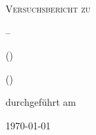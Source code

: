 
\makeatletter
\newcommand*{\protokollemailparse}[1]{%
	\@for\@tempa:=#1\do{%
		\normalsize\email{\@tempa}\\
	}%
}
\makeatother

\begin{titlepage}
	\centering
	{\scshape\LARGE Versuchsbericht zu \par}
	\vspace{1cm}
	{\scshape\huge \varNum {} -- \varName\par}
	\vspace{2.5cm}
	{\LARGE \varGruppe\par}
	\vspace{0.5cm}
	{\large \varNameA (\varEmailA) \par}
	{\large \varNameB (\varEmailB) \par}
	\vfill
	durchgeführt am \varDatum\par
	{\large \varBetreuer} 
	\vfill	
	{\large \today\par}
\end{titlepage}


\maketitle
